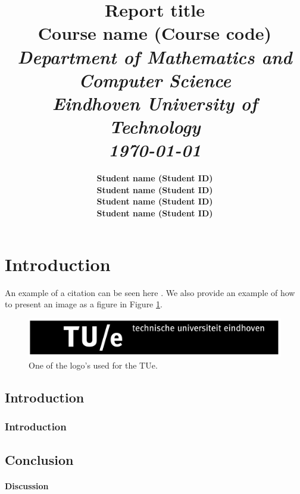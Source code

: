 \documentclass[11pt]{template/report} %
\title{\textbf{Report title} \\[0.5cm]
{\Large Course name (Course code) \\[1.0cm]
         \large \textit{Department of Mathematics and Computer Science \\[0.3cm]
                Eindhoven University of Technology \\[0.6cm]
         \small \today}}}
\author{\textbf{
            Student name (Student ID)\\[0.1cm]
            Student name (Student ID)\\[0.1cm]
            Student name (Student ID)\\[0.1cm]
            Student name (Student ID)}}
\begin{document}
\thispagestyle{empty}

\maketitle
\newpage

\section{Introduction}
    
    \lipsum[1] 
    
    An example of a citation can be seen here \cite{de1996control}. We also provide an example of how to present an image as a figure in Figure \ref{fig:TUe_logo}.
    
    \begin{figure}[h!]
        \centering
        \includegraphics[width=0.8\linewidth]{images/logo/TUe.png}
        \caption{One of the logo's used for the TUe.}
        \label{fig:TUe_logo}
    \end{figure}
    
    \subsection{Introduction}
    
        \lipsum[2-3]
        
        \subsubsection*{Introduction}
        
            \lipsum[4]
        
    \subsection{Conclusion}
    
        \lipsum[5]
        
        \paragraph{Discussion} \lipsum[6]
        
\newpage



\end{document}
